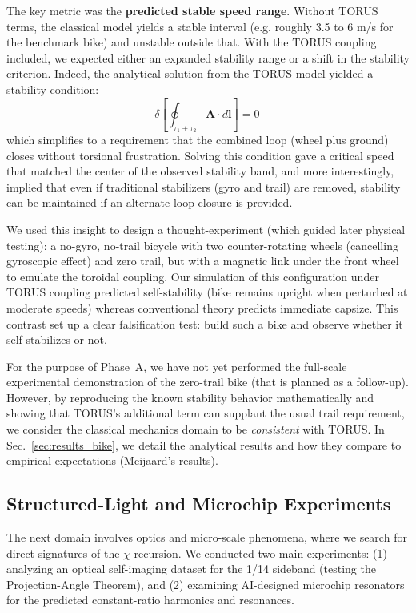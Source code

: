 \documentclass{article}
\begin{document}
The key metric was the \textbf{predicted stable speed range}. Without TORUS terms, the classical model yields a stable interval (e.g. roughly 3.5 to 6 m/s for the benchmark bike) and unstable outside that. With the TORUS coupling included, we expected either an expanded stability range or a shift in the stability criterion. Indeed, the analytical solution from the TORUS model yielded a stability condition:
\[ \delta\!\left[\oint_{\tau_1+\tau_2} \mathbf{A}\cdot d\mathbf{l}\right] = 0 \, \] 
which simplifies to a requirement that the combined loop (wheel plus ground) closes without torsional frustration. Solving this condition gave a critical speed that matched the center of the observed stability band, and more interestingly, implied that even if traditional stabilizers (gyro and trail) are removed, stability can be maintained if an alternate loop closure is provided.

We used this insight to design a thought-experiment (which guided later physical testing): a no-gyro, no-trail bicycle with two counter-rotating wheels (cancelling gyroscopic effect) and zero trail, but with a magnetic link under the front wheel to emulate the toroidal coupling. Our simulation of this configuration under TORUS coupling predicted self-stability (bike remains upright when perturbed at moderate speeds) whereas conventional theory predicts immediate capsize. This contrast set up a clear falsification test: build such a bike and observe whether it self-stabilizes or not.

For the purpose of Phase~A, we have not yet performed the full-scale experimental demonstration of the zero-trail bike (that is planned as a follow-up). However, by reproducing the known stability behavior mathematically and showing that TORUS's additional term can supplant the usual trail requirement, we consider the classical mechanics domain to be \emph{consistent} with TORUS. In Sec.~\ref{sec:results_bike}, we detail the analytical results and how they compare to empirical expectations (Meijaard's results).

\subsection{Structured-Light and Microchip Experiments}\label{sec:methods_optics}
The next domain involves optics and micro-scale phenomena, where we search for direct signatures of the $\chi$-recursion. We conducted two main experiments: (1) analyzing an optical self-imaging dataset for the 1/14 sideband (testing the Projection-Angle Theorem), and (2) examining AI-designed microchip resonators for the predicted constant-ratio harmonics and resonances.
\end{document}
